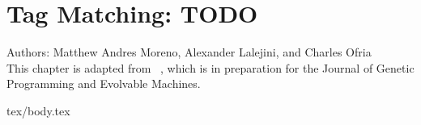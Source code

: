\chapter{Tag Matching: TODO}
\label{ch:tag-matching}

\noindent
Authors: Matthew Andres Moreno, Alexander Lalejini, and Charles Ofria \\
This chapter is adapted from ~\citep{moreno2021matchmaker}, which is in preparation for the Journal of Genetic Programming and Evolvable Machines.

{tex/body.tex}

